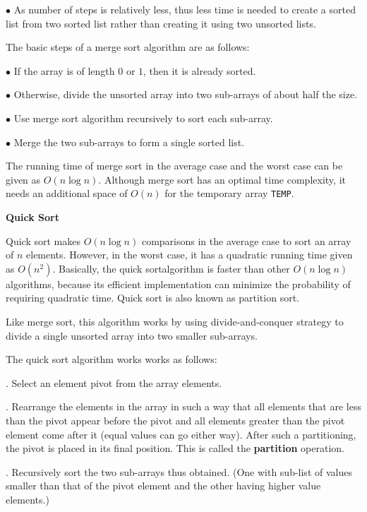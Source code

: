 \vskip 3mm
\qquad$\bullet$ As number of steps is relatively less, thus less time is needed to create a sorted list from two  sorted list rather than creating it using two unsorted lists.

\vskip 1mm
The basic steps of a merge sort algorithm are as follows:

\vskip 3mm
\qquad$\bullet$ If the array is of length $0$ or $1$, then it is already sorted.

\vskip 3mm
\qquad$\bullet$ Otherwise, divide the unsorted array into two sub-arrays of about half the size.

\vskip 3mm
\qquad$\bullet$ Use merge sort algorithm recursively to sort each sub-array.

\vskip 3mm
\qquad$\bullet$ Merge the two sub-arrays to form a single sorted list.

\vskip 1mm
The running time of merge sort in the average case and the worst case can be given as $O(n\log n)$. Although merge sort has an optimal time complexity, it needs an additional space of $O(n)$ for the temporary array {\tt TEMP}.

\filbreak
\vskip 1cm
{\bf Quick Sort}

\vskip 1mm
Quick sort makes $O(n \log n)$ comparisons in the average case to sort an array of $n$ elements. However, in the worst case, it has a quadratic running time given as $O(n^2)$. Basically, the quick sortalgorithm is faster than other $O(n\log n)$ algorithms, because its efficient implementation can minimize the probability of requiring quadratic time. Quick sort is also known as partition sort.

\vskip 1mm
Like merge sort, this algorithm works by using divide-and-conquer strategy to divide a single unsorted array into two smaller sub-arrays.

\vskip 1mm
The quick sort algorithm works works as follows:

\vskip 3mm
. Select an element pivot from the array elements.

\vskip 3mm
. Rearrange the elements in the array in such a way that all elements that are less than the pivot appear before the pivot and all elements greater than the pivot element come after it (equal values can go either way). After such a partitioning, the pivot is placed in its final position. This is called the {\bf partition} operation.

\vskip 3mm
. Recursively sort the two sub-arrays thus obtained. (One with sub-list of values smaller than that of the pivot element and the other having higher value elements.)

